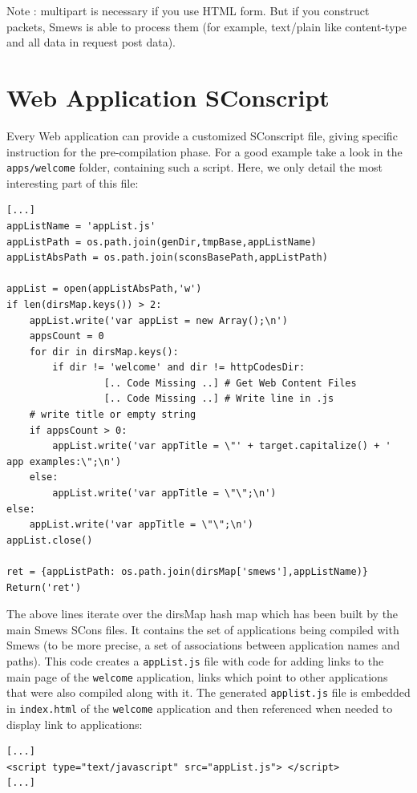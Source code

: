 \documentclass{report}
\begin{document}
Note : multipart is necessary if you use HTML form. But if you construct packets, Smews is able to process them (for example, text/plain like content-type and all data in request post data).

\section{Web Application SConscript}

Every Web application can provide a customized SConscript file, giving specific instruction for the pre-compilation phase. For a good example take a look in the \texttt{apps/welcome} folder, containing such a script. Here, we only detail the most interesting part of this file:
\lstset{language=python}
\begin{lstlisting}
[...]
appListName = 'appList.js'
appListPath = os.path.join(genDir,tmpBase,appListName)
appListAbsPath = os.path.join(sconsBasePath,appListPath)

appList = open(appListAbsPath,'w')
if len(dirsMap.keys()) > 2:
    appList.write('var appList = new Array();\n')
    appsCount = 0
    for dir in dirsMap.keys():
        if dir != 'welcome' and dir != httpCodesDir:
                 [.. Code Missing ..] # Get Web Content Files
                 [.. Code Missing ..] # Write line in .js
    # write title or empty string
    if appsCount > 0:
        appList.write('var appTitle = \"' + target.capitalize() + '
app examples:\";\n')
    else:
        appList.write('var appTitle = \"\";\n')
else:
    appList.write('var appTitle = \"\";\n')
appList.close()

ret = {appListPath: os.path.join(dirsMap['smews'],appListName)}
Return('ret')
\end{lstlisting}

The above lines iterate over the dirsMap hash map which has been built by the main Smews SCons files. It contains the set of applications being compiled with Smews (to be more precise, a set of associations between application names and paths). This code creates a \verb+appList.js+ file with code for adding links to the main page of the \verb+welcome+ application, links which point to other applications that were also compiled along with it. The generated \verb+applist.js+ file is embedded in \verb+index.html+ of the \verb+welcome+ application and then referenced when needed to display link to applications:
\lstset{language=html}
\begin{lstlisting}
[...]
<script type="text/javascript" src="appList.js"> </script>
[...]
\end{lstlisting}
\end{document}
